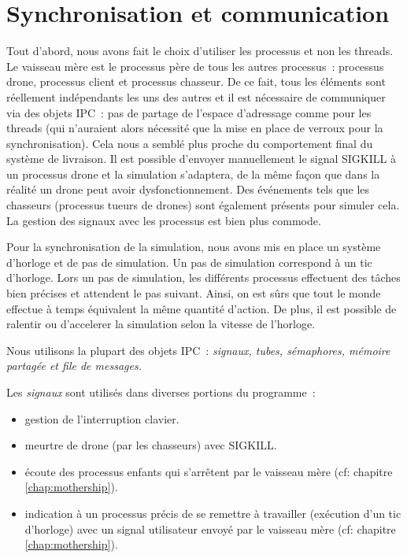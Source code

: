 \section{Synchronisation et communication}

Tout d'abord, nous avons fait le choix d'utiliser les processus et non les threads.
Le vaisseau mère est le processus père de tous les autres processus : processus drone, processus client et processus chasseur.
De ce fait, tous les éléments sont réellement indépendants les uns des autres et il est nécessaire de communiquer via
des objets IPC : pas de partage de l'espace d'adressage comme pour les threads (qui n'auraient alors nécessité que
la mise en place de verroux pour la synchronisation). Cela nous a semblé plus proche
du comportement final du système de livraison. Il est possible d'envoyer manuellement le signal SIGKILL à un processus
drone et la simulation s'adaptera, de la même façon que dans la réalité un drone peut avoir dysfonctionnement.
Des événements tels que les chasseurs (processus tueurs de drones) sont également présents pour simuler cela.
La gestion des signaux avec les processus est bien plus commode.

Pour la synchronisation de la simulation, nous avons mis en place un système d'horloge et de pas de simulation. Un pas
de simulation correspond à un tic d'horloge. Lors un pas de simulation, les différents processus effectuent des tâches
bien précises et attendent le pas suivant. Ainsi, on est sûrs que tout le monde effectue à temps équivalent la même
quantité d'action. De plus, il est possible de ralentir ou d'accelerer la simulation selon la vitesse de l'horloge.

Nous utilisons la plupart des objets IPC : \emph{signaux, tubes, sémaphores, mémoire partagée et file de messages.}

Les \emph{signaux} sont utilisés dans diverses portions du programme :
\begin{itemize}
    \item gestion de l'interruption clavier.
    \item meurtre de drone (par les chasseurs) avec SIGKILL.
    \item écoute des processus enfants qui s'arrêtent par le vaisseau mère (cf: chapitre \ref{chap:mothership}).
    \item indication à un processus précis de se remettre à travailler (exécution d'un tic d'horloge) avec un signal utilisateur
        envoyé par le vaisseau mère (cf: chapitre \ref{chap:mothership}).
\end{itemize}

